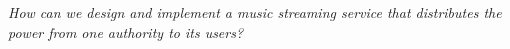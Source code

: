 \textit{How can we design and implement a music streaming service that distributes the power from one authority to its users?}



